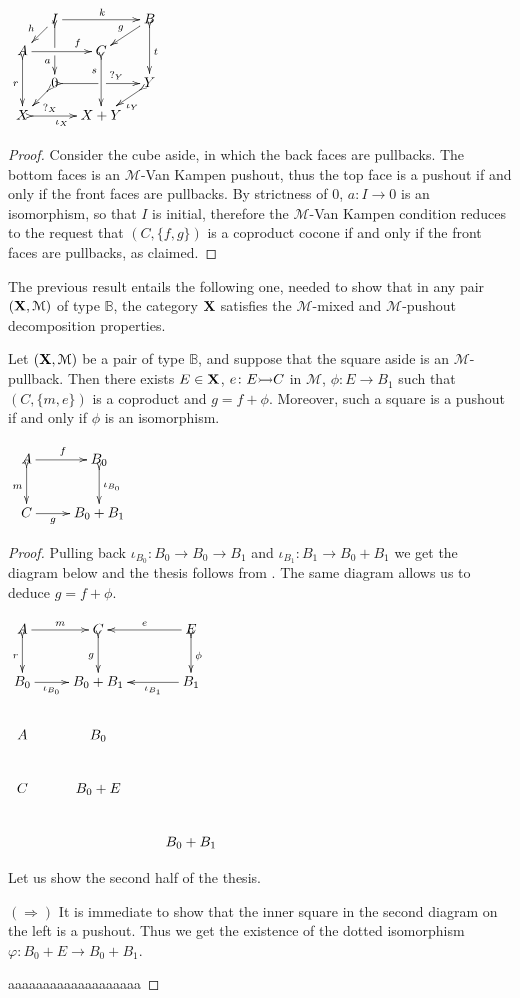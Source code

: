 \documentclass[a4paper,UKenglish,cleveref,pdftex,thm-restate,numberwithinsect]{lipics-v2021}
\newcommand{\mto}[0]{\scalebox{1}{$\rightarrowtail$}}
\def\B{\textbf {\textup{B}}}
\def\C{\textbf {\textup{C}}}
\def\X{\textbf {\textup{X}}}
\begin{document}
\noindent 
\parbox{4cm}{$\xymatrix@C=10pt@R=10pt{&I\ar@{>->}[dd]|\hole_(.65){a}\ar[rr]^{k} \ar[dl]_{h} && B \ar@{>->}[dd]^{t} \ar[dl]_{g} \\ A  \ar@{>->}[dd]_{r}\ar[rr]^(.7){f} & & C \ar@{>->}[dd]_(.3){s}\\&0\ar@{>->}[rr]|\hole^(.65){?_Y} \ar@{>->}[dl]^{?_X} && Y \ar@{>->}[dl]^{\iota_Y} \\X \ar@{>->}[rr]_{\iota_X} & & X+Y}$}
 \parbox{10cm}{\begin{proof}
Consider the cube aside, in which the back faces are pullbacks. The bottom faces is an $\mathcal{M}$-Van Kampen pushout, thus the top face is a pushout if and only if the front faces are pullbacks. By strictness of $0$, $a\colon I\to 0$ is an isomorphism, so that $I$ is initial, therefore the $\mathcal{M}$-Van Kampen condition reduces to the request that $(C, \{f,g\})$ is a coproduct cocone if and only if the front faces are pullbacks, as claimed.
\end{proof}}

The previous result entails the following one, needed to show that  in any pair $(\X, \mathcal{M})$ of type $\mathbb{B}$, the category $\X$ satisfies the $\mathcal{M}$-mixed and $\mathcal{M}$-pushout decomposition properties.

\noindent
\parbox{10.7cm}{\begin{proposition}\label{prop:po2}
		Let $(\X, \mathcal{M})$ be a pair of type $\mathbb{B}$, and suppose that the square aside is an $\mathcal{M}$-pullback. Then there exists $E\in \X$, $e\colon E\mto C$ in $\mathcal{M}$, $\phi:E\to B_1$ such that $(C, \{m, e\})$ is a coproduct and $g=f+\phi$. Moreover, such a square is a pushout if and only if $\phi$ is an isomorphism.
\end{proposition}} \parbox{3cm}{\vspace{-.2cm}$\xymatrix{A  \ar[r]^{f} \ar@{>->}[d]_{m}& B_0 \ar@{>->}[d]^{\iota_{B_{0}}}\\ C\ar[r]_-{g} & B_0+B_1}$}
\iffalse 
\begin{proof}
		Pulling back $\iota_{B_0}\colon B_0\to B_0\to B_1$ and $\iota_{B_1}\colon B_1\to B_0 + B_1$ we get the diagram below and the thesis follows from . The same diagram allows us to deduce $g=f+\phi$.	
	\parbox{5.2cm}{$\xymatrix{A\ar[r]^-{m} \ar@{>->}[d]_{r}& C  \ar@{>->}[d]_{g}& E \ar@{>->}[d]^{\phi}\ar[l]_-{e}\\B_0  \ar[r]_-{\iota_{B_0}}& B_0+B_1 & B_1 \ar[l]^-{\iota_{B_1}} \\ A & B_0 \\C & B_0+E\\ &&B_0+B_1}$}\parbox{8.8cm}{\vspace{-4.1cm}Let us show the second half of the thesis.
	
	$(\Rightarrow)$ It is immediate to show that the inner square in the second diagram on the left is a pushout. Thus we get the existence of the dotted isomorphism $\varphi\colon B_0+E\to B_0+B_1$.}
		
		\parbox{5cm}{aaaaaaaaaaaaaaaaaaa}
\end{proof}	
\end{document}
